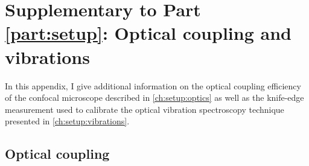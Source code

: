 \setchapterpreamble[u]{\margintoc}
\chapter{Supplementary to Part \ref{part:setup}: Optical coupling and vibrations}\label{ch:app:setup}
In this appendix, I give additional information on the optical coupling efficiency of the confocal microscope described in \cref{ch:setup:optics} as well as the knife-edge measurement used to calibrate the optical vibration spectroscopy technique presented in \cref{ch:setup:vibrations}.

\section{Optical coupling}\label{sec:app:setup:optics}
